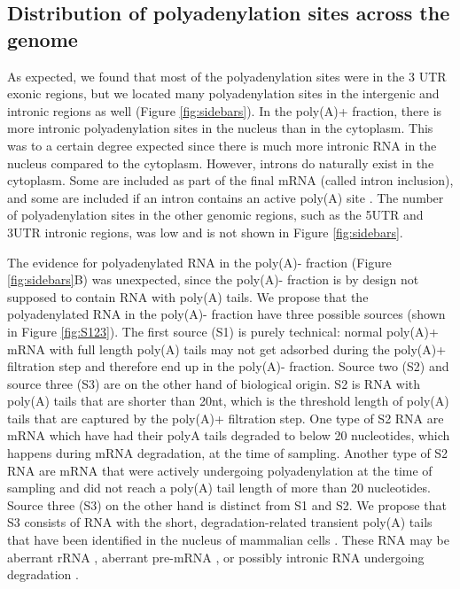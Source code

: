 \subsection{Distribution of polyadenylation sites across the genome}
As expected, we found that most of the polyadenylation sites were in the 3\ppp
UTR exonic regions, but we located many polyadenylation sites in the intergenic
and intronic regions as well (Figure \ref{fig:sidebars}). In the poly(A)+
fraction, there is more intronic polyadenylation sites in the nucleus than in the
cytoplasm. This was to a certain degree expected since there is much more
intronic RNA in the nucleus compared to the cytoplasm. However, introns do
naturally exist in the cytoplasm. Some are included as part of the final mRNA
(called intron inclusion), and some are included if an intron contains an
active poly(A) site \cite{tian_widespread_2007}. The number of polyadenylation
sites in the other genomic regions, such as the 5\ppp UTR and 3\ppp UTR
intronic regions, was low and is not shown in Figure \ref{fig:sidebars}.

The evidence for polyadenylated RNA in the poly(A)- fraction (Figure
\ref{fig:sidebars}B) was unexpected, since the poly(A)- fraction is by design
not supposed to contain RNA with poly(A) tails. We propose that the
polyadenylated RNA in the poly(A)- fraction have three possible sources (shown
in Figure \ref{fig:S123}). The first source (S1) is purely technical: normal
poly(A)+ mRNA with full length poly(A) tails may not get adsorbed during the
poly(A)+ filtration step and therefore end up in the poly(A)- fraction. Source
two (S2) and source three (S3) are on the other hand of biological origin. S2
is RNA with poly(A) tails that are shorter than 20nt, which is the threshold
length of poly(A) tails that are captured by the poly(A)+ filtration step. One
type of S2 RNA are mRNA which have had their polyA tails degraded to below 20
nucleotides, which happens during mRNA degradation, at the time of sampling.
Another type of S2 RNA are mRNA that were actively undergoing polyadenylation
at the time of sampling and did not reach a poly(A) tail length of more than 20
nucleotides. Source three (S3) on the other hand is distinct from S1 and S2. We
propose that S3 consists of RNA with the short, degradation-related transient
poly(A) tails that have been identified in the nucleus of mammalian cells
\cite{lemay_nuclear_2010}.  These RNA may be aberrant rRNA
\cite{shcherbik_polyadenylation_2010}, aberrant pre-mRNA
\cite{west_adenylation_2006}, or possibly intronic RNA undergoing degradation
\cite{schmidt_polyadenylation_2010}.

